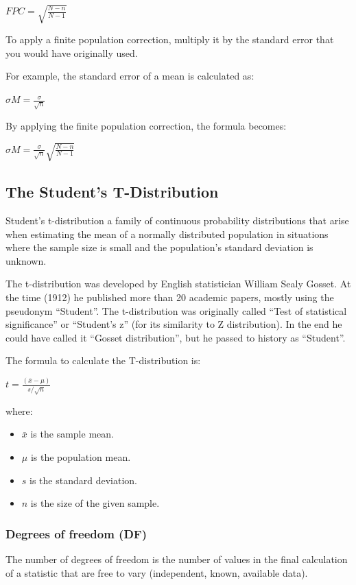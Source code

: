 \documentclass{article}
\begin{document}
$FPC = \sqrt{\frac{N -n}{N - 1}}$

To apply a finite population correction, multiply it by the standard error that you would have originally used.

For example, the standard error of a mean is calculated as:

$\sigma{M} = \frac{\sigma}{\sqrt{n}}$

By applying the finite population correction, the formula becomes:

$\sigma{M} = \frac{\sigma}{\sqrt{n}}\sqrt{\frac{N -n}{N - 1}}$

\subsection{The Student's T-Distribution}
Student's t-distribution a family of continuous probability distributions that arise when estimating the mean of a normally distributed population in situations where the sample size is small and the population's standard deviation is unknown.

The t-distribution was developed by English statistician William Sealy Gosset. 
At the time (1912) he published more than 20 academic papers, mostly using the pseudonym “Student”.
The t-distribution was originally called “Test of statistical significance” or “Student’s z” (for its similarity to Z distribution).
In the end he could have called it “Gosset distribution”, but he passed to history as “Student”. 

The formula to calculate the T-distribution is:

$t= \frac{(\bar{x} - \mu)}{s/\sqrt{n}}$

where:
\begin{itemize}
    \item $\bar{x}$ is the sample mean.
    \item $\mu$ is the population mean.
    \item $s$ is the standard deviation.
    \item $n$ is the size of the given sample.
\end{itemize}

\subsubsection{Degrees of freedom (DF)}
The number of degrees of freedom is the number of values in the final calculation of a statistic that are free to vary (independent, known, available data).
\end{document}
